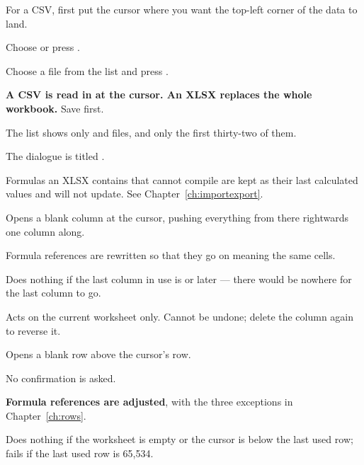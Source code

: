 \begin{ccprocedure}[]
\item For a CSV, first put the cursor where you want the top-left corner of the
data to land.
\item Choose  or press .
\item Choose a file from the list and press .
\end{ccprocedure}

\begin{ccsteps}
\item \textbf{A CSV is read in at the cursor. An XLSX replaces the whole
workbook.} Save first.
\item The list shows only  and  files, and only the
first thirty-two of them.
\item The dialogue is titled .
\item Formulas an XLSX contains that \ccprod{} cannot compile are kept as their
last calculated values and will not update. See Chapter~\ref{ch:importexport}.
\end{ccsteps}


Opens a blank column at the cursor, pushing everything from there rightwards
one column along.

\begin{ccsteps}
\item Formula references are rewritten so that they go on meaning the same
cells.
\item Does nothing if the last column in use is  or later --- there
would be nowhere for the last column to go.
\item Acts on the current worksheet only. Cannot be undone; delete the column
again to reverse it.
\end{ccsteps}


Opens a blank row above the cursor's row.

\begin{ccsteps}
\item No confirmation is asked.
\item \textbf{Formula references are adjusted}, with the three exceptions in
Chapter~\ref{ch:rows}.
\item Does nothing if the worksheet is empty or the cursor is below the last
used row; fails if the last used row is 65,534.
\end{ccsteps}

